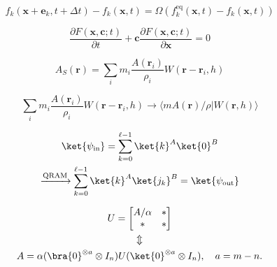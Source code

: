 \begin{equation}
\label{eq:lbm}
f_k(\mathbf{x}+\mathbf{e}_k, t+\Delta t) - f_k(\mathbf{x}, t) = 
\Omega(f_k^\text{eq}(\mathbf{x}, t) - f_k(\mathbf{x}, t))
\end{equation}

\begin{equation}
\label{e:lbm}
\frac{\partial F (\mathbf{x},\mathbf{c};t)}{\partial t} + \mathbf{c} \frac{\partial F(\mathbf{x},\mathbf{c};t)}{\partial \mathbf{x}}=0
\end{equation}

\begin{equation}
\label{eq:sph-interpolant}
A_S(\mathbf{r}) = \sum_i m_i \frac{A(\mathbf{r}_i)}{\rho_i} W(\mathbf{r}-\mathbf{r}_i,h)
\end{equation}

\begin{equation}

\sum_i m_i \frac{A(\mathbf{r}_i)}{\rho_i} W(\mathbf{r}-\mathbf{r}_i,h) \to
\langle m A(\mathbf{r})/\rho
\vert W(\mathbf{r},h)
\rangle
\end{equation}

\begin{gather}

\ket{\psi_\text{in}} =
\sum_{k=0}^{\ell-1} \ket{k}^A \ket{0}^B \nonumber\\
\xrightarrow{\text{QRAM}}
\sum_{k=0}^{\ell-1} \ket{k}^A \ket{j_k}^B
= \ket{\psi_\text{out}} \label{eq:qram}
\end{gather}

\begin{gather}

U = \begin{bmatrix} A/\alpha & * \\ * & * \end{bmatrix}
\\
\Updownarrow \nonumber
\\
A = \alpha (\bra{0}^{\otimes a} \otimes I_n) U (\ket{0}^{\otimes a} \otimes I_n), \quad a=m-n.
\end{gather}

